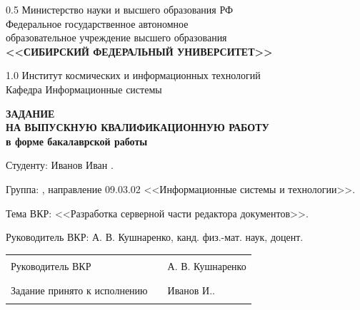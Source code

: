 \begin{center}
	\begin{spacing}{0.5}
		Министерство науки и высшего образования  РФ\\
		{\small Федеральное государственное автономное}\\
		{\small образовательное учреждение высшего образования}\\
		\textbf{\small<<СИБИРСКИЙ ФЕДЕРАЛЬНЫЙ УНИВЕРСИТЕТ>>}\\[6mm]
	\end{spacing}
	\begin{spacing}{1.0}
		Институт космических и информационных технологий\\
		Кафедра Информационные системы\\
	\end{spacing}
\end{center}		

\begin{center}
	\textbf{ЗАДАНИЕ \\ НА ВЫПУСКНУЮ КВАЛИФИКАЦИОННУЮ РАБОТУ}\\
	\textbf{в форме бакалаврской работы}
\end{center}

\vspace{1cm}

Студенту: Иванов Иван .

Группа: , направление 09.03.02 <<Информационные системы и технологии>>.

Тема ВКР: <<Разработка серверной части редактора документов>>.

Руководитель ВКР: А. В. Кушнаренко, канд. физ.-мат. наук, доцент.

\vfill

\begin{tabular}{m{}m{}m{}}
	Руководитель ВКР& \rule{3cm}{.1pt} & А. В. Кушнаренко\\
	Задание принято к исполнению& \rule{3cm}{.1pt} & Иванов И..\\
\end{tabular}

\newpage